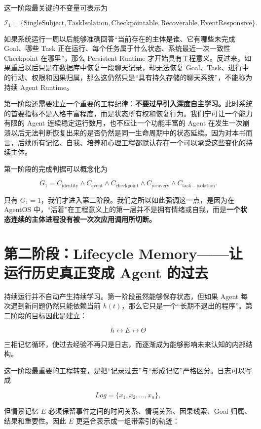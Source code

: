 这一阶段最关键的不变量可表示为

\[
\mathcal I_1
=
\{
\mathrm{SingleSubject},
\mathrm{TaskIsolation},
\mathrm{Checkpointable},
\mathrm{Recoverable},
\mathrm{EventResponsive}
\}.
\]

如果系统运行一周以后能够准确回答“当前存在的主体是谁、它有哪些未完成 Goal、哪些 Task 正在运行、每个任务属于什么状态、系统最近一次一致性 Checkpoint 在哪里”，那么 Persistent Runtime 才开始具有工程意义。反过来，如果重启以后只是在数据库中恢复一段聊天记录，却无法恢复 Goal、Task、进行中的行动、权限和因果归属，那么这仍然只是“具有持久存储的聊天系统”，不能称为持续 Agent Runtime。

第一阶段还需要建立一个重要的工程纪律：\textbf{不要过早引入深度自主学习。}此时系统的首要指标不是人格丰富程度，而是状态所有权和恢复行为。我们宁可让一个能力有限的 Agent 连续稳定运行数月，也不应让一个功能丰富的 Agent 在发生一次崩溃以后无法判断恢复出来的是否仍然是同一生命周期中的状态延续。因为对本书而言，后续所有记忆、自我、培养和心理工程都默认存在一个可以承受这些变化的持续主体。

第一阶段的完成判据可以概念化为

\[
G_1=
C_{\mathrm{identity}}
\land
C_{\mathrm{event}}
\land
C_{\mathrm{checkpoint}}
\land
C_{\mathrm{recovery}}
\land
C_{\mathrm{task-isolation}}.
\]

只有 \(G_1=1\)，我们才进入第二阶段。我们之所以如此强调这一点，是因为在 AgentOS 中，“活着”在工程意义上的第一层并不是拥有情绪或自我，而是\textbf{一个状态连续的主体进程没有被一次次应用调用所切断。}

\section{第二阶段：Lifecycle Memory——让运行历史真正变成 Agent 的过去}

持续运行并不自动产生持续学习。第一阶段虽然能够保存状态，但如果 Agent 每次遇到新问题仍然只能依赖当前 \(h(t)\)，那么它只是一个“长期不退出的程序”。第二阶段的目标因此是建立：

\[
\boxed{
h
\leftrightarrow
E
\leftrightarrow
\Theta
}
\]

三相记忆循环，使过去经验不再只是日志，而逐渐成为能够影响未来认知的内部结构。

这一阶段最重要的工程转变，是把“记录过去”与“形成记忆”严格区分。日志可以写成

\[
Log=\{x_1,x_2,\ldots,x_n\},
\]

但情景记忆 \(E\) 必须保留事件之间的时间关系、情境关系、因果线索、Goal 归属、结果和重要性。因此 \(E\) 更适合表示成一组带索引的轨迹：

